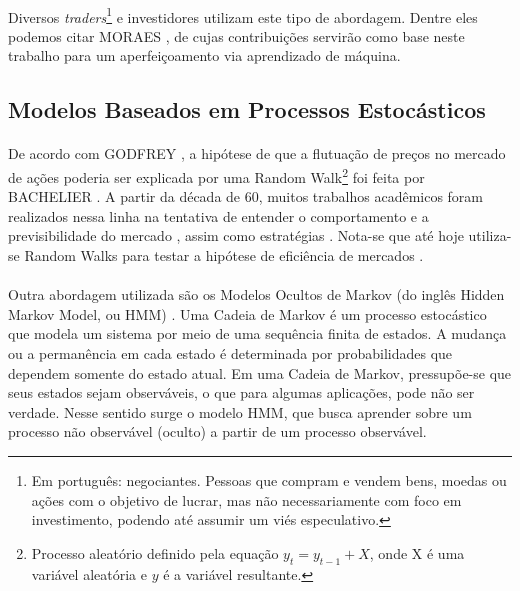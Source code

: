 \paragraph{} Diversos \textit{traders}\footnote{Em português: negociantes. Pessoas que compram e vendem bens, moedas ou ações com o objetivo de lucrar, mas não necessariamente com foco em investimento, podendo até assumir um viés especulativo.} e investidores utilizam este tipo de abordagem. Dentre eles podemos citar MORAES \cite{moraes2007se}, de cujas contribuições servirão como base neste trabalho para um aperfeiçoamento via aprendizado de máquina.


\subsection{Modelos Baseados em Processos Estocásticos}

\paragraph{} De acordo com GODFREY \cite{godfrey1964random}, a hipótese de que a flutuação de preços no mercado de ações poderia ser explicada por uma Random Walk\footnote{Processo aleatório definido pela equação \begin{math}y_t = y_{t-1} + X\end{math}, onde X é uma variável aleatória e \(y\) é a variável resultante.} foi feita por BACHELIER \cite{bachelier1900theorie}. A partir da década de 60, muitos trabalhos acadêmicos foram realizados nessa linha na tentativa de entender o comportamento e a previsibilidade do mercado \cite{fama1970efficient, solnik1973note, cooper1982world}, assim como estratégias \cite{malkiel2019random}. Nota-se que até hoje utiliza-se Random Walks para testar a hipótese de eficiência de mercados \cite{said2015efficiency}.

\paragraph{} Outra abordagem utilizada são os Modelos Ocultos de Markov (do inglês Hidden Markov Model, ou HMM) \cite{rabiner1989tutorial}. Uma Cadeia de Markov é um processo estocástico que modela um sistema por meio de uma sequência finita de estados. A mudança ou a permanência em cada estado é determinada por probabilidades que dependem somente do estado atual. Em uma Cadeia de Markov, pressupõe-se que seus estados sejam observáveis, o que para algumas aplicações, pode não ser verdade. Nesse sentido surge o modelo HMM, que busca aprender sobre um processo não observável (oculto) a partir de um processo observável.

